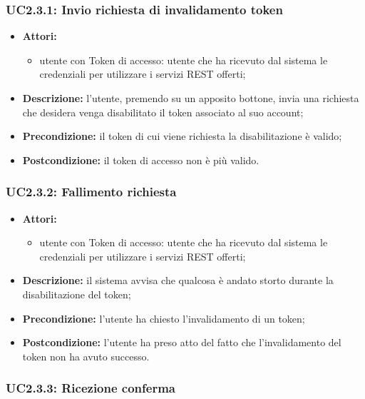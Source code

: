 \subsubsection{UC2.3.1: Invio richiesta di invalidamento token}

\begin{itemize}
	\item \textbf{Attori:}
	\begin{itemize}
		\item utente con Token di accesso: utente che ha ricevuto dal sistema le credenziali per utilizzare i servizi REST offerti;
	\end{itemize}
	\item \textbf{Descrizione:} l'utente, premendo su un apposito bottone, invia una richiesta che desidera venga disabilitato il token associato al suo account;
	\item \textbf{Precondizione:} il token di cui viene richiesta la disabilitazione è valido;
	\item \textbf{Postcondizione:} il token di accesso non è più valido.
\end{itemize}

\subsubsection{UC2.3.2: Fallimento richiesta}

\begin{itemize}
	\item \textbf{Attori:}
	\begin{itemize}
		\item utente con Token di accesso: utente che ha ricevuto dal sistema le credenziali per utilizzare i servizi REST offerti;
	\end{itemize}
	\item \textbf{Descrizione:} il sistema avvisa che qualcosa è andato storto durante la disabilitazione del token;
	\item \textbf{Precondizione:} l'utente ha chiesto l'invalidamento di un token;
	\item \textbf{Postcondizione:} l'utente ha preso atto del fatto che l'invalidamento del token non ha avuto successo.
\end{itemize}

\subsubsection{UC2.3.3: Ricezione conferma}


